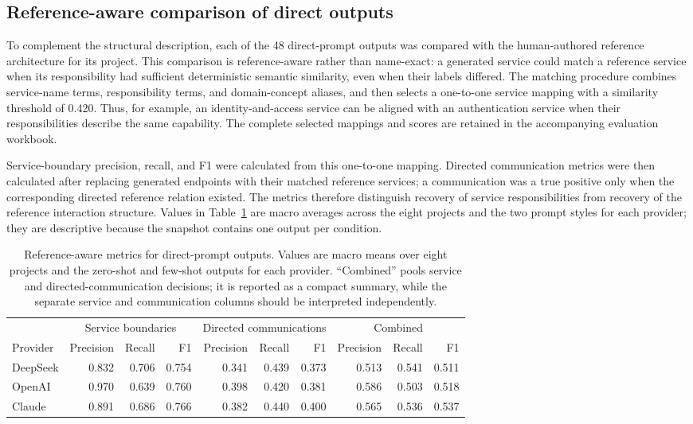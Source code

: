 \documentclass[acmsmall,screen,anonymous,review]{acmart}
\begin{document}
\subsection{Reference-aware comparison of direct outputs}
\label{sec:reference-aware-results}

To complement the structural description, each of the 48 direct-prompt outputs was compared with the human-authored reference architecture for its project. This comparison is reference-aware rather than name-exact: a generated service could match a reference service when its responsibility had sufficient deterministic semantic similarity, even when their labels differed. The matching procedure combines service-name terms, responsibility terms, and domain-concept aliases, and then selects a one-to-one service mapping with a similarity threshold of 0.420. Thus, for example, an identity-and-access service can be aligned with an authentication service when their responsibilities describe the same capability. The complete selected mappings and scores are retained in the accompanying evaluation workbook.

Service-boundary precision, recall, and F1 were calculated from this one-to-one mapping. Directed communication metrics were then calculated after replacing generated endpoints with their matched reference services; a communication was a true positive only when the corresponding directed reference relation existed. The metrics therefore distinguish recovery of service responsibilities from recovery of the reference interaction structure. Values in Table~\ref{tab:reference-provider-metrics} are macro averages across the eight projects and the two prompt styles for each provider; they are descriptive because the snapshot contains one output per condition.

\begin{table}[t]
\centering
\small
\begin{tabular}{lrrrrrrrrr}
\toprule
& \multicolumn{3}{c}{Service boundaries} & \multicolumn{3}{c}{Directed communications} & \multicolumn{3}{c}{Combined} \\
\cmidrule(lr){2-4}\cmidrule(lr){5-7}\cmidrule(lr){8-10}
Provider & Precision & Recall & F1 & Precision & Recall & F1 & Precision & Recall & F1 \\
\midrule
DeepSeek & 0.832 & 0.706 & 0.754 & 0.341 & 0.439 & 0.373 & 0.513 & 0.541 & 0.511 \\
OpenAI   & 0.970 & 0.639 & 0.760 & 0.398 & 0.420 & 0.381 & 0.586 & 0.503 & 0.518 \\
Claude   & 0.891 & 0.686 & 0.766 & 0.382 & 0.440 & 0.400 & 0.565 & 0.536 & 0.537 \\
\bottomrule
\end{tabular}
\caption{Reference-aware metrics for direct-prompt outputs. Values are macro means over eight projects and the zero-shot and few-shot outputs for each provider. ``Combined'' pools service and directed-communication decisions; it is reported as a compact summary, while the separate service and communication columns should be interpreted independently.}
\label{tab:reference-provider-metrics}
\end{table}
\end{document}
